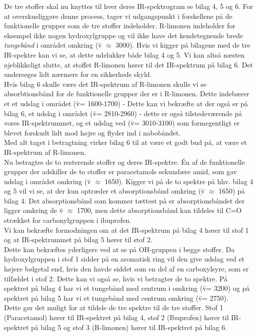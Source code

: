 De tre stoffer skal nu knyttes til hver deres IR-spektrogram se bilag 4, 5 og 6. For at overskueliggøre denne process, tager vi udgangspunkt i forskellene på de funktionelle grupper som de tre stoffer indeholder. R-limonen indeholder for eksempel ikke nogen hydroxylgruppe og vil ikke have det kendetegnende brede \emph{tungebånd} i området omkring (\={v} $\approx$ 3000). Hvis vi kigger på bilagene med de tre IR-spektre kan vi se, at dette udelukker både bilag 4 og 5. Vi kan altså næsten øjeblikkeligt slutte, at stoffet R-limonen hører til det IR-spektrum på bilag 6. Det undersøges lidt nærmere for en sikkerheds skyld. 
\\

Hvis bilag 6 skulle være det IR-spektrum af R-limonen skulle vi se absorbtionsbånd for de funktionelle grupper der er i R-limonen. Dette indebærer et et udslag i området (\={v}= 1600-1700) - Dette kan vi bekræfte at der også er på bilag 6, et udslag i området (\={v}= 2810-2960) - dette er også tilstedeværende på vores IR-spektrummet, og et udslag ved (\={v}= 3010-3100) som formegentligt er blevet forskudt lidt mod højre og flyder ind i nabobåndet. 
\\

Med alt taget i betragtning virker bilag 6 til at være et godt bud på, at være et IR-spektrum af R-limonen.
\\

Nu betragtes de to resterende stoffer og deres IR-spektre. Én af de funktionelle grupper der adskiller de to stoffer er paracetamols sekundære amid, som gav udslag i området omkring (\={v} $\approx$ 1650). Kigger vi på de to spektre på hhv. bilag 4 og 5 vil vi se, at der kun optræder et absorptionsbånd omkring (\={v} $\approx$ 1650) på bilag 4. Det absorptionsbånd som kommer tættest på er absorptionsbåndet der ligger omkring de \={v} $\approx$ 1700, men dette absorptionsbånd kan tildeles til C=O strækket for carbonylgruppen i ibuprofen.
\\

Vi kan bekræfte formodningen om at det IR-spektrum på bilag 4 hører til stof 1 og at IR-spektrummet på bilag 5 hører til stof 2.
\\

Dette kan bekræftes yderligere ved at se på OH-gruppen i begge stoffer. Da hydroxylgruppen i stof 1 sidder på en aromatisk ring vil den give udslag ved et højere bølgetal end, hvis den havde siddet som en del af en carboxylsyre, som er tilfældet i stof 2. Dette kan vi også se, hvis vi betragter de to spektre. På spektret på bilag 4 har vi et tungebånd med centrum i omkring (\={v}= 3200) og på spektret på bilag 5 har vi et tungebånd med centrum omkring (\={v}= 2750).
\\

Dette gør det muligt for at tildele de tre spektre til de tre stoffer. Stof 1 (Paracetamol) hører til IR-spektret på bilag 4, stof 2 (Ibuprofen) hører til IR-spektret på bilag 5 og stof 3 (R-limonen) hører til IR-spektret på bilag 6.